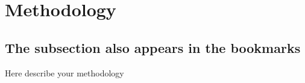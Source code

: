 
\section{Methodology}

\subsection{The subsection also appears in the bookmarks}

Here describe your methodology